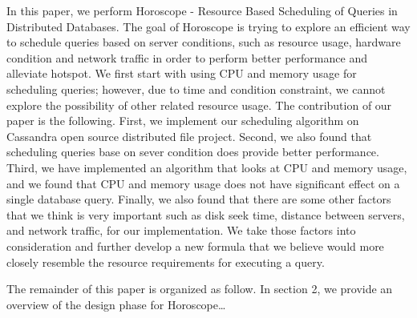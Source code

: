 In this paper, we perform Horoscope - Resource Based Scheduling of Queries in Distributed Databases. The goal of Horoscope is trying to explore an efficient way to schedule queries based on server conditions, such as resource usage, hardware condition and network traffic in order to perform better performance and alleviate hotspot. We first start with using CPU and memory usage for scheduling queries; however, due to time and condition constraint, we cannot explore the possibility of other related resource usage. The contribution of our paper is the following. First, we implement our scheduling algorithm on Cassandra open source distributed file project. Second, we also found that scheduling queries base on sever condition does provide better performance. Third, we have implemented an algorithm that looks at CPU and memory usage, and we found that CPU and memory usage does not have significant effect on a single database query. Finally, we also found that there are some other factors that we think is very important such as disk seek time, distance between servers, and network traffic, for our implementation. We take those factors into consideration and further develop a new formula that we believe would more closely resemble the resource requirements for executing a query.
 
The remainder of this paper is organized as follow. In section 2, we provide an overview of the design phase for Horoscope…
